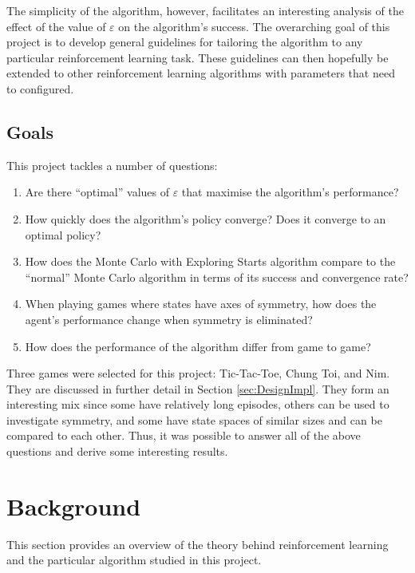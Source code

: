 \documentclass[11pt,a4paper]{report}
\begin{document}
The simplicity of the algorithm, however, facilitates an interesting analysis of the effect of the value of $\varepsilon$ on the algorithm's success. The overarching goal of this project is to develop general guidelines for tailoring the algorithm to any particular reinforcement learning task. These guidelines can then hopefully be extended to other reinforcement learning algorithms with parameters that need to configured.


\section{Goals}
\label{sec:goals}

This project tackles a number of questions:

\begin{enumerate}
	\item Are there ``optimal'' values of $\varepsilon$ that maximise the algorithm's performance?
	\item How quickly does the algorithm's policy converge? Does it converge to an optimal policy?
    \item How does the Monte Carlo with Exploring Starts algorithm \cite{rl-book} compare to the ``normal'' Monte Carlo algorithm in terms of its success and convergence rate?
	\item When playing games where states have axes of symmetry, how does the agent's performance change when symmetry is eliminated?
	\item How does the performance of the algorithm differ from game to game?
\end{enumerate}

Three games were selected for this project: Tic-Tac-Toe, Chung Toi, and Nim. They are discussed in further detail in Section \ref{sec:DesignImpl}. They form an interesting mix since some have relatively long episodes, others can be used to investigate symmetry, and some have state spaces of similar sizes and can be compared to each other. Thus, it was possible to answer all of the above questions and derive some interesting results.



\chapter{Background}

This section provides an overview of the theory behind reinforcement learning and the particular algorithm studied in this project.
\end{document}
